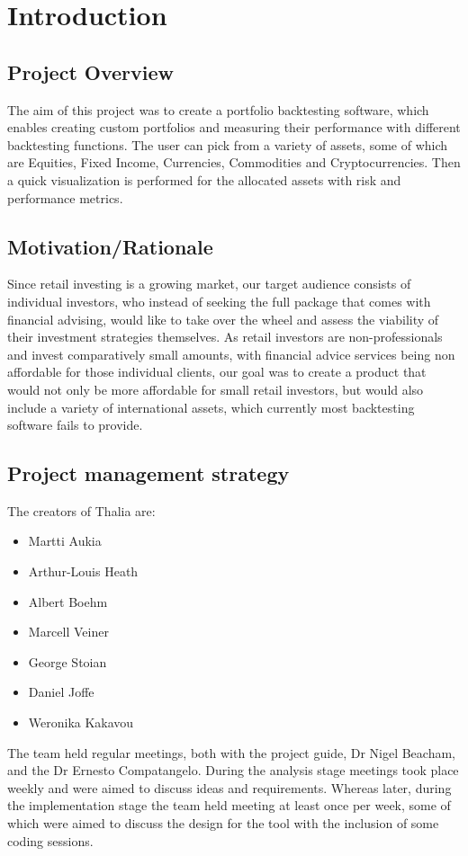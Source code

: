 \documentclass[main.tex]{subfiles}
\begin{document}
\section{Introduction}
\subsection {Project Overview}

The aim of this project was to create a portfolio backtesting software, which enables creating custom portfolios and measuring their performance with different backtesting functions. The user can pick from a variety of assets, some of which are Equities, Fixed Income, Currencies, Commodities and Cryptocurrencies. Then a quick visualization is performed for the allocated assets with risk and performance metrics.
\subsection{Motivation/Rationale}
Since retail investing is a growing market, our target audience consists of individual investors, who instead of seeking the full package that comes with financial advising, would like to take over the wheel and assess the viability of their investment strategies themselves. As retail investors are non-professionals and invest comparatively small amounts, with financial advice services being non affordable for those individual clients, our goal was to create a product that would not only be more affordable for small retail investors, but would also include a variety of international assets, which currently most backtesting software fails to provide.

\subsection{Project management strategy}

The creators of Thalia are:
\begin{itemize}
    \item Martti Aukia
    \item Arthur-Louis Heath
	\item Albert Boehm
	\item Marcell Veiner
	\item George Stoian
	\item Daniel Joffe
	\item Weronika Kakavou
\end{itemize}

The team held regular meetings, both with the project guide, Dr Nigel Beacham, and the Dr Ernesto Compatangelo. During the analysis stage meetings took place weekly and were aimed to discuss ideas and requirements. Whereas later, during the implementation stage the team held meeting at least once per week, some of which were aimed to discuss the design for the tool with the inclusion of some coding sessions.
\end{document}
